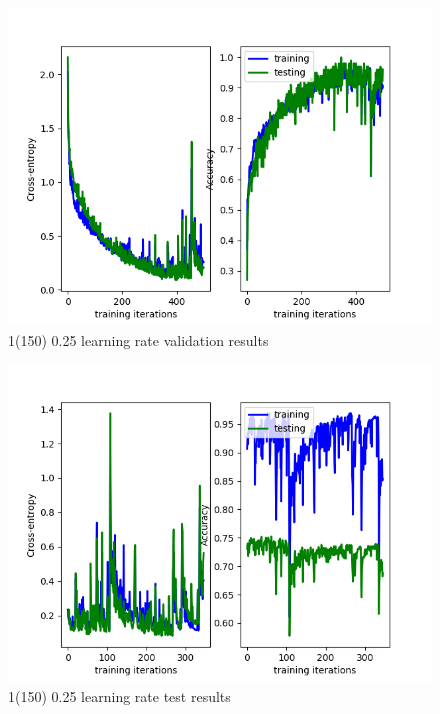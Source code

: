 \documentclass[a4paper]{report}
\begin{document}
\begin{figure}[h]
\begin{center}
\includegraphics[scale=0.5]{150025.png}
\end{center}
\caption{1(150) 0.25 learning rate validation results}
\end{figure}
\begin{figure}[h]
\begin{center}
\includegraphics[scale=0.5]{150025test.png}
\end{center}
\caption{1(150) 0.25 learning rate test results}
\end{figure}
\end{document}
